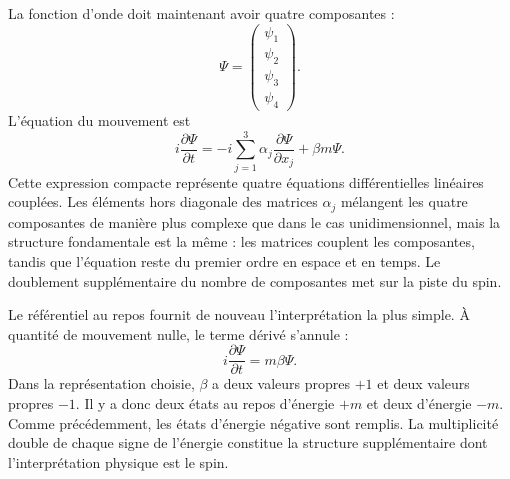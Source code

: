 La fonction d’onde doit maintenant avoir quatre composantes :
\begin{equation}
\Psi=
\begin{pmatrix}
\psi_1\\
\psi_2\\
\psi_3\\
\psi_4
\end{pmatrix}.
\end{equation}
L’équation du mouvement est
\begin{equation}
i\frac{\partial\Psi}{\partial t}
=
-i\sum_{j=1}^{3}\alpha_j
\frac{\partial\Psi}{\partial x_j}
+\beta m\Psi.
\end{equation}
Cette expression compacte représente quatre équations différentielles linéaires couplées. Les éléments hors diagonale des matrices \(\alpha_j\) mélangent les quatre composantes de manière plus complexe que dans le cas unidimensionnel, mais la structure fondamentale est la même : les matrices couplent les composantes, tandis que l’équation reste du premier ordre en espace et en temps. Le doublement supplémentaire du nombre de composantes met sur la piste du spin.

\begin{classroomqa}
\end{classroomqa}

Le référentiel au repos fournit de nouveau l’interprétation la plus simple. À quantité de mouvement nulle, le terme dérivé s’annule :
\begin{equation}
i\frac{\partial\Psi}{\partial t}=m\beta\Psi.
\end{equation}
Dans la représentation choisie, \(\beta\) a deux valeurs propres \(+1\) et deux valeurs propres \(-1\). Il y a donc deux états au repos d’énergie \(+m\) et deux d’énergie \(-m\). Comme précédemment, les états d’énergie négative sont remplis. La multiplicité double de chaque signe de l’énergie constitue la structure supplémentaire dont l’interprétation physique est le spin.

